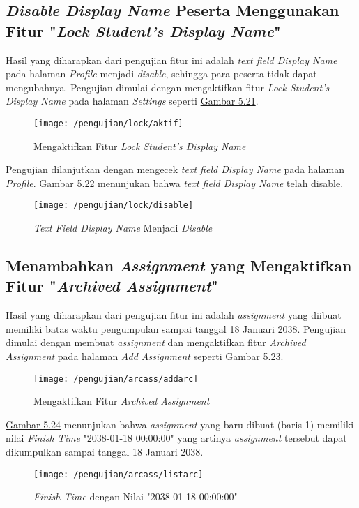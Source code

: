 	\subsection{\textit{Disable Display Name} Peserta Menggunakan Fitur "\textit{Lock Student's Display Name}"}
	Hasil yang diharapkan dari pengujian fitur ini adalah \textit{text field Display Name} pada halaman \textit{Profile} menjadi \textit{disable}, sehingga para peserta tidak dapat mengubahnya. Pengujian dimulai dengan mengaktifkan fitur \textit{Lock Student's Display Name} pada halaman \textit{Settings} seperti \hyperref[fig:dp]{Gambar 5.21}.
	\begin{figure}[H]
		\centering  
		\texttt{[image: /pengujian/lock/aktif]}  
		\caption[Mengaktifkan Fitur \textit{Lock Student's Display Name}]{Mengaktifkan Fitur \textit{Lock Student's Display Name}} 
		\label{fig:aktif} 
	\end{figure}
	
	Pengujian dilanjutkan dengan mengecek \textit{text field Display Name} pada halaman \textit{Profile}. \hyperref[fig:dp]{Gambar 5.22} menunjukan bahwa \textit{text field Display Name} telah disable.
	\begin{figure}[H]
		\centering  
		\texttt{[image: /pengujian/lock/disable]}  
		\caption[\textit{Text Field Display Name} Menjadi \textit{Disable}]{\textit{Text Field Display Name} Menjadi \textit{Disable}} 
		\label{fig:disable} 
	\end{figure}

	\subsection{Menambahkan \textit{Assignment} yang Mengaktifkan Fitur "\textit{Archived Assignment}"}
	Hasil yang diharapkan dari pengujian fitur ini adalah \textit{\textit{assignment}} yang diibuat memiliki batas waktu pengumpulan sampai tanggal 18 Januari 2038. Pengujian dimulai dengan membuat \textit{assignment} dan mengaktifkan fitur \textit{Archived Assignment} pada halaman \textit{Add Assignment} seperti \hyperref[fig:arc]{Gambar 5.23}.
	\begin{figure}[H]
		\centering  
		\texttt{[image: /pengujian/arcass/addarc]}  
		\caption[Mengaktifkan Fitur \textit{Archived Assignment}]{Mengaktifkan Fitur \textit{Archived Assignment}} 
		\label{fig:arc} 
	\end{figure}
	
	\hyperref[fig:listarc]{Gambar 5.24} menunjukan bahwa \textit{assignment} yang baru dibuat (baris 1) memiliki nilai \textit{Finish Time} "2038-01-18 00:00:00" yang artinya \textit{assignment} tersebut dapat dikumpulkan sampai tanggal 18 Januari 2038.
	\begin{figure}[H]
		\centering  
		\texttt{[image: /pengujian/arcass/listarc]}  
		\caption[\textit{Finish Time} dengan Nilai "2038-01-18 00:00:00"]{\textit{Finish Time} dengan Nilai "2038-01-18 00:00:00"} 
		\label{fig:listarc} 
	\end{figure}

